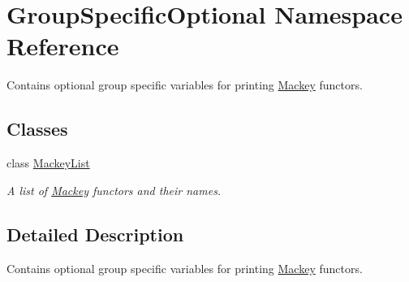 \hypertarget{namespaceGroupSpecificOptional}{}\section{Group\+Specific\+Optional Namespace Reference}
\label{namespaceGroupSpecificOptional}


Contains optional group specific variables for printing \hyperlink{namespaceMackey}{Mackey} functors.  


\subsection*{Classes}
\begin{DoxyCompactItemize}
\item 
class \hyperlink{classGroupSpecificOptional_1_1MackeyList}{Mackey\+List}
\begin{DoxyCompactList}\small\item\em A list of \hyperlink{namespaceMackey}{Mackey} functors and their names. \end{DoxyCompactList}\end{DoxyCompactItemize}


\subsection{Detailed Description}
Contains optional group specific variables for printing \hyperlink{namespaceMackey}{Mackey} functors. 